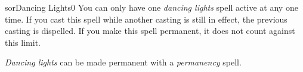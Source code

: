 \begin{spellcard}{sor}{Dancing Lights}{0}
  You can only have one \emph{dancing lights} spell active at any one time.
  If you cast this spell while another casting is still in effect, the previous casting is dispelled.
  If you make this spell permanent, it does not count against this limit.

  \emph{Dancing lights} can be made permanent with a \emph{permanency} spell.
\end{spellcard}
